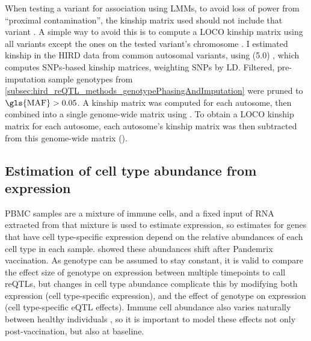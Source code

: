 %
When testing a variant for association using \glspl{LMM}, to avoid loss of power from \enquote{proximal contamination}, the kinship matrix used should not include that variant \autocite{listgarten2012ImprovedLinearMixed}.
A simple way to avoid this is to compute a \gls{LOCO} kinship matrix using all variants except the ones on the tested variant's chromosome \autocite{lippert2011FaSTLinearMixed}.
I estimated kinship in the \gls{HIRD} data from common autosomal variants, using  (5.0) \autocite{speed2012ImprovedHeritabilityEstimation}, which computes \glspl{SNP}-based kinship matrices, weighting \glspl{SNP} by \gls{LD}.
Filtered, pre-imputation sample genotypes from \cref{subsec:hird_reQTL_methods_genotypePhasingAndImputation} were pruned to $\text{\gls{MAF}} > 0.05$.
A kinship matrix was computed for each autosome, then combined into a single genome-wide matrix using .
To obtain a \gls{LOCO} kinship matrix for each autosome, each autosome's kinship matrix was then subtracted from this genome-wide matrix ().

\subsection{Estimation of cell type abundance from expression}
\label{subsec:hird_reQTL_xCell}

%
\Gls{PBMC} samples are a mixture of immune cells, and a fixed input of RNA extracted from that mixture is used to estimate expression, 
so estimates for genes that have cell type-specific expression depend on the relative abundances of each cell type in each sample.
\textcite{sobolev2016AdjuvantedInfluenzaH1N1Vaccination} showed these abundances shift after Pandemrix vaccination.
As genotype can be assumed to stay constant, it is valid to compare the effect size of genotype on expression between multiple timepoints to call \glspl{reQTL}, 
but changes in cell type abundance complicate this by modifying both expression (cell type-specific expression), 
and the effect of genotype on expression (cell type-specific \gls{eQTL} effects).
Immune cell abundance also varies naturally between healthy individuals \autocite{brodin2015VariationHumanImmune,brodin2017HumanImmuneSystem}, so it is important to model these effects not only post-vaccination, but also at baseline.

